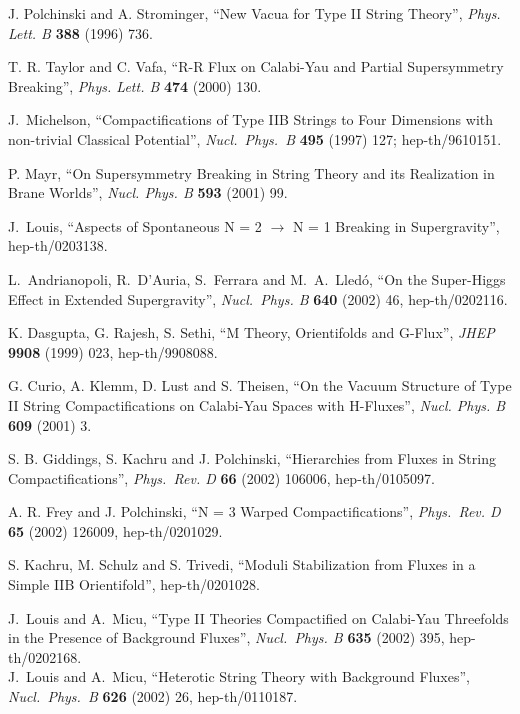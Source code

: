 \documentclass[a4paper,12pt]{article}
\begin{document}
\begin{thebibliography}{99}

J. Polchinski and A. Strominger, ``New Vacua for Type II String
Theory'', {\it Phys.  Lett.  B} {\bf 388} (1996)  736.

T. R. Taylor and C. Vafa, ``R-R Flux on Calabi-Yau and Partial
Supersymmetry Breaking'', {\it Phys. Lett. B} {\bf 474}
(2000) 130.

 J.~Michelson,
``Compactifications of Type IIB Strings to Four Dimensions with non-trivial Classical Potential'',
{\it  Nucl.\ Phys.\ B} {\bf 495} (1997) 127; hep-th/9610151.

P. Mayr, ``On Supersymmetry Breaking in String Theory and its
Realization in Brane Worlds'', {\it Nucl.  Phys.  B} {\bf 593} 
(2001) 99.


 J.~Louis, %
``Aspects of Spontaneous N = 2 $\to$ N = 1 Breaking in Supergravity'', hep-th/0203138. 

 L.~Andrianopoli, R.~D'Auria, S.~Ferrara and M.~A.~Lled\'o,
``On the Super-Higgs Effect in Extended Supergravity'', {\it Nucl.\ Phys. B} {\bf 640} (2002) 46,
 hep-th/0202116. 


K. Dasgupta, G. Rajesh, S. Sethi,
``M Theory, Orientifolds and G-Flux'', {\it JHEP} {\bf 9908} (1999)  023, 
hep-th/9908088. 

G. Curio, A. Klemm, D. Lust and S. Theisen, ``On the Vacuum
Structure of Type II String Compactifications on  Calabi-Yau
Spaces with H-Fluxes'', {\it Nucl. Phys. B} {\bf 609} (2001) 3.


 S. B. Giddings, S. Kachru and J. Polchinski,
``Hierarchies from Fluxes in String Compactifications'', {\it Phys.\ Rev. D} {\bf 66} (2002) 106006,
hep-th/0105097.

A. R. Frey and J. Polchinski, ``N = 3 Warped Compactifications'', {\it Phys.\ Rev. D} {\bf 65} (2002) 126009,
hep-th/0201029.


S. Kachru, M. Schulz and S. Trivedi,
 ``Moduli Stabilization from Fluxes in a Simple IIB Orientifold'',
 hep-th/0201028.


 J.~Louis and A.~Micu,
``Type II Theories Compactified on Calabi-Yau Threefolds in the Presence of Background Fluxes'',
{\it Nucl.\ Phys. B} {\bf 635} (2002) 395, hep-th/0202168.\\
J.~Louis and A.~Micu,
``Heterotic String Theory with Background Fluxes'', {\it Nucl.\ Phys.\ B} {\bf 626} (2002) 26, hep-th/0110187.




\end{thebibliography}
\end{document}

